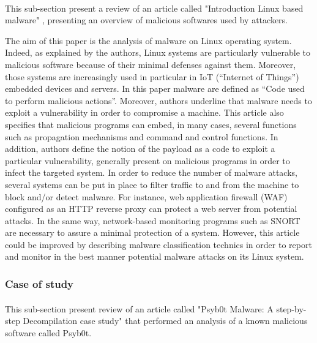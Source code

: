 \paragraph{}

This sub-section present a review of an article called "Introduction Linux based malware"
\cite{paperIntroLinuxBased},
presenting an overview of malicious softwares used by attackers.

The aim of this paper is the analysis of malware on Linux operating system. Indeed, as
explained by the authors, Linux systems are particularly vulnerable to malicious software
because of their minimal defenses against them. Moreover, those systems are increasingly
used in particular in IoT (“Internet of Things”) embedded devices and servers. In this paper
malware are defined as “Code used to perform malicious actions”. Moreover, authors underline
that malware needs to exploit a vulnerability in order to compromise a machine. This
article also specifies that malicious programs can embed, in many cases, several functions
such as propagation mechanisms and command and control functions. In addition, authors 
define the notion of the payload as a code to exploit a particular vulnerability, generally
present on malicious programs in order to infect the targeted system.  
In order to reduce the number of malware attacks, several systems can be put in place to
filter traffic to and from the machine to block and/or detect malware. For instance, web
application firewall (WAF) configured as an HTTP reverse proxy can protect a web server
from potential attacks. In the same way, network-based monitoring programs such as SNORT
are necessary to assure a minimal protection of a system.
However, this article could be improved by describing malware classification technics
in order to report and monitor in the best manner potential malware attacks on its Linux
system.

\subsubsection{Case of study} %

\paragraph{}

This sub-section present review of an article called "Psyb0t Malware: A step-by-step
Decompilation case study" \cite{paperPsyBot} that performed an analysis of a known malicious software
called Psyb0t. 

